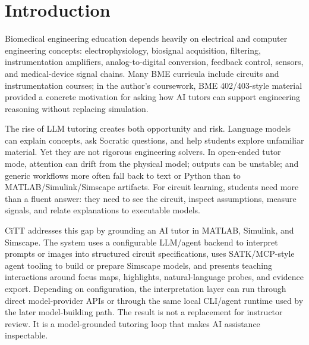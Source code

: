 \section{Introduction}

Biomedical engineering education depends heavily on electrical and computer engineering concepts: electrophysiology, biosignal acquisition, filtering, instrumentation amplifiers, analog-to-digital conversion, feedback control, sensors, and medical-device signal chains. Many BME curricula include circuits and instrumentation courses; in the author's coursework, BME 402/403-style material provided a concrete motivation for asking how AI tutors can support engineering reasoning without replacing simulation.

The rise of LLM tutoring creates both opportunity and risk. Language models can explain concepts, ask Socratic questions, and help students explore unfamiliar material. Yet they are not rigorous engineering solvers. In open-ended tutor mode, attention can drift from the physical model; outputs can be unstable; and generic workflows more often fall back to text or Python than to MATLAB/Simulink/Simscape artifacts. For circuit learning, students need more than a fluent answer: they need to see the circuit, inspect assumptions, measure signals, and relate explanations to executable models.

CiTT addresses this gap by grounding an AI tutor in MATLAB, Simulink, and Simscape. The system uses a configurable LLM/agent backend to interpret prompts or images into structured circuit specifications, uses SATK/MCP-style agent tooling to build or prepare Simscape models, and presents teaching interactions around focus maps, highlights, natural-language probes, and evidence export. Depending on configuration, the interpretation layer can run through direct model-provider APIs or through the same local CLI/agent runtime used by the later model-building path. The result is not a replacement for instructor review. It is a model-grounded tutoring loop that makes AI assistance inspectable.

